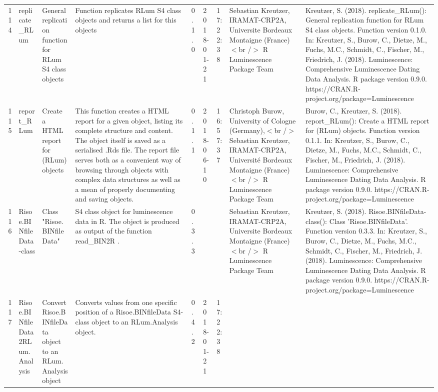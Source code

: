 \begin{table}[ht]
\begin{tabular}{rllllllll}
 \\ 
  114 & replicate\_RLum & General replication function for RLum S4 class objects & Function replicates RLum S4 class objects and returns a list for this objects & 0.1.0 & 2018-01-21 & 17:22:38
 & Sebastian Kreutzer, IRAMAT-CRP2A, Universite Bordeaux Montaigne (France)$<$br /$>$  R Luminescence Package Team & Kreutzer, S. (2018). replicate\_RLum(): General replication function for RLum S4 class objects. Function version 0.1.0. In: Kreutzer, S., Burow, C., Dietze, M., Fuchs, M.C., Schmidt, C., Fischer, M., Friedrich, J. (2018). Luminescence: Comprehensive Luminescence Dating Data Analysis. R package version 0.9.0. https://CRAN.R-project.org/package=Luminescence
 \\ 
  115 & report\_RLum & Create a HTML report for (RLum) objects & This function creates a HTML report for a given object, listing its complete structure and content. The object itself is saved as a serialised .Rds file. The report file serves both as a convenient way of browsing through objects with complex data structures as well as a mean of properly documenting and saving objects. & 0.1.1 & 2018-06-10 & 16:57:37
 & Christoph Burow, University of Cologne (Germany),$<$br /$>$ Sebastian Kreutzer, IRAMAT-CRP2A, Université Bordeaux Montaigne (France)  $<$br /$>$  R Luminescence Package Team & Burow, C., Kreutzer, S. (2018). report\_RLum(): Create a HTML report for (RLum) objects. Function version 0.1.1. In: Kreutzer, S., Burow, C., Dietze, M., Fuchs, M.C., Schmidt, C., Fischer, M., Friedrich, J. (2018). Luminescence: Comprehensive Luminescence Dating Data Analysis. R package version 0.9.0. https://CRAN.R-project.org/package=Luminescence
 \\ 
  116 & Risoe.BINfileData-class & Class  "Risoe.BINfileData" & S4 class object for luminescence data in R. The object is produced as output of the function  read\_BIN2R . & 0.3.3
 &  &  & Sebastian Kreutzer, IRAMAT-CRP2A, Universite Bordeaux Montaigne (France)$<$br /$>$  R Luminescence Package Team & Kreutzer, S. (2018). Risoe.BINfileData-class(): Class 'Risoe.BINfileData'. Function version 0.3.3. In: Kreutzer, S., Burow, C., Dietze, M., Fuchs, M.C., Schmidt, C., Fischer, M., Friedrich, J. (2018). Luminescence: Comprehensive Luminescence Dating Data Analysis. R package version 0.9.0. https://CRAN.R-project.org/package=Luminescence
 \\ 
  117 & Risoe.BINfileData2RLum.Analysis & Convert Risoe.BINfileData object to an RLum.Analysis object & Converts values from one specific position of a Risoe.BINfileData S4-class object to an RLum.Analysis object. & 0.4.2 & 2018-01-21 & 17:22:38

\end{tabular}
\end{table}
